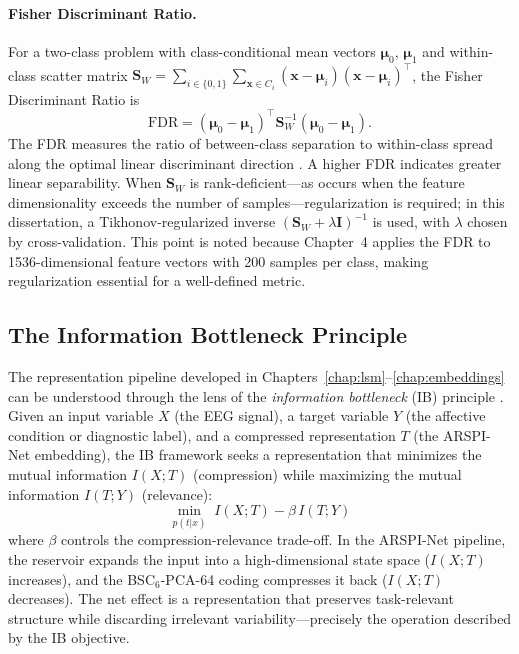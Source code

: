 \paragraph{Fisher Discriminant Ratio.}
For a two-class problem with class-conditional mean vectors $\boldsymbol{\mu}_0$, $\boldsymbol{\mu}_1$ and within-class scatter matrix $\mathbf{S}_W = \sum_{i \in \{0,1\}} \sum_{\mathbf{x} \in C_i} (\mathbf{x} - \boldsymbol{\mu}_i)(\mathbf{x} - \boldsymbol{\mu}_i)^\top$, the Fisher Discriminant Ratio is
\begin{equation}
    \text{FDR} = (\boldsymbol{\mu}_0 - \boldsymbol{\mu}_1)^\top \mathbf{S}_W^{-1} (\boldsymbol{\mu}_0 - \boldsymbol{\mu}_1).
    \label{eq:fdr}
\end{equation}
The FDR measures the ratio of between-class separation to within-class spread along the optimal linear discriminant direction \cite{duda_pattern_2001}. A higher FDR indicates greater linear separability. When $\mathbf{S}_W$ is rank-deficient---as occurs when the feature dimensionality exceeds the number of samples---regularization is required; in this dissertation, a Tikhonov-regularized inverse $(\mathbf{S}_W + \lambda \mathbf{I})^{-1}$ is used, with $\lambda$ chosen by cross-validation. This point is noted because Chapter~4 applies the FDR to 1536-dimensional feature vectors with 200 samples per class, making regularization essential for a well-defined metric.

\subsection{The Information Bottleneck Principle}
\label{sec:info_bottleneck}

The representation pipeline developed in Chapters~\ref{chap:lsm}--\ref{chap:embeddings} can be understood through the lens of the \emph{information bottleneck} (IB) principle \cite{tishby_deep_2015}. Given an input variable $X$ (the EEG signal), a target variable $Y$ (the affective condition or diagnostic label), and a compressed representation $T$ (the ARSPI-Net embedding), the IB framework seeks a representation that minimizes the mutual information $I(X; T)$ (compression) while maximizing the mutual information $I(T; Y)$ (relevance):
\begin{equation}
    \min_{p(t|x)} \; I(X; T) - \beta \, I(T; Y)
    \label{eq:ib}
\end{equation}
where $\beta$ controls the compression-relevance trade-off. In the ARSPI-Net pipeline, the reservoir expands the input into a high-dimensional state space ($I(X; T)$ increases), and the BSC$_6$-PCA-64 coding compresses it back ($I(X; T)$ decreases). The net effect is a representation that preserves task-relevant structure while discarding irrelevant variability---precisely the operation described by the IB objective.

